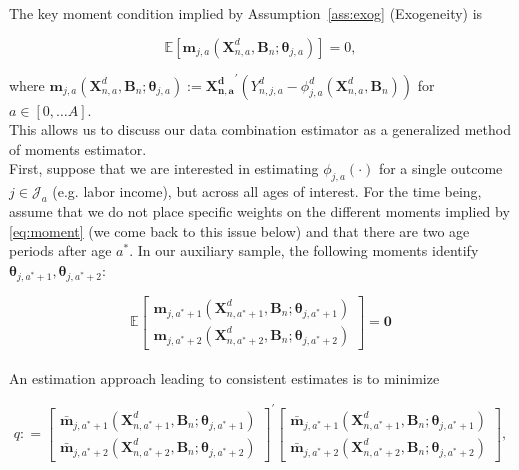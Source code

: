 \noindent The key moment condition implied by Assumption~\ref{ass:exog} (Exogeneity) is 

\begin{equation}
\mathbb{E} \left[ \bm{m}_{j,a} \left( \bm{X}_{n,a}^d, \bm{B}_{n}; \bm{\theta}_{j,a} \right) \right] = 0, \label{eq:moment}
\end{equation}

\noindent where $\bm{m}_{j,a} \left( \bm{X}_{n,a}^d, \bm{B}_{n} ; \bm{\theta}_{j,a} \right) := {\bm{X_{n,a}^d}}^{'} \left( Y_{n,j,a}^d -   \phi^d_{j,a} \left( \bm{X}_{n,a}^d, \bm{B}_{n} \right) \right)$ for $a \in [0, \ldots A]$.\\

\noindent This allows us to discuss our data combination estimator as a generalized method of moments estimator.\\

\noindent First, suppose that we are interested in estimating $\phi_{j,a} \left( \cdot \right)$ for a single outcome $j \in \mathcal{J}_{a}$ (e.g. labor income), but across all ages of interest. For the time being, assume that we do not place specific weights on the different moments implied by \eqref{eq:moment} (we come back to this issue below) and that there are two age periods after age $a^*$. In our auxiliary sample, the following moments identify $\bm{\theta}_{j,a^*+1}, \bm{\theta}_{j,a^*+2}$: 

\begin{equation}
\mathbb{E}
\begin{bmatrix}
\bm{m}_{j,a^*+1} \left( \bm{X}_{n,a^*+1}^d, \bm{B}_{n}; \bm{\theta}_{j,a^*+1} \right) \\ \bm{m}_{j,a^*+2} \left( \bm{X}_{n,a^*+2}^d, \bm{B}_{n}; \bm{\theta}_{j,a^*+2} \right) 
\end{bmatrix}
= \bm{0} \label{eq:smoment}
\end{equation}\\

\noindent An estimation approach leading to consistent estimates is to minimize

\begin{equation}
q : = 
{\begin{bmatrix}
\bm{\bar{m}}_{j,a^*+1} \left( \bm{X}_{n,a^*+1}^d, \bm{B}_{n}; \bm{\theta}_{j,a^*+1} \right) \\ \bm{\bar{m}}_{j,a^*+2} \left( \bm{X}_{n,a^*+2}^d, \bm{B}_{n}; \bm{\theta}_{j,a^*+2} \right) 
\end{bmatrix}}^{'}
\begin{bmatrix}
\bm{\bar{m}}_{j,a^*+1} \left( \bm{X}_{n,a^*+1}^d, \bm{B}_{n}; \bm{\theta}_{j,a^*+1} \right) \\ \bm{\bar{m}}_{j,a^*+2} \left( \bm{X}_{n,a^*+2}^d, \bm{B}_{n}; \bm{\theta}_{j,a^*+2} \right) 
\end{bmatrix}, 
\end{equation}\\


